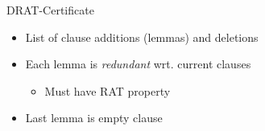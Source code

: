 \documentclass[fleqn]{beamer}
\begin{document}
\begin{frame}{DRAT-Certificate}
  \begin{itemize}
   \item<+-> List of clause additions (lemmas) and deletions
   \item<+-> Each lemma is \emph{redundant} wrt. current clauses
    \begin{itemize}
     \item<+-> Must have RAT property
    \end{itemize}
   \item<+-> Last lemma is empty clause
    
  \end{itemize}
    
    
\end{frame}
\end{document}
